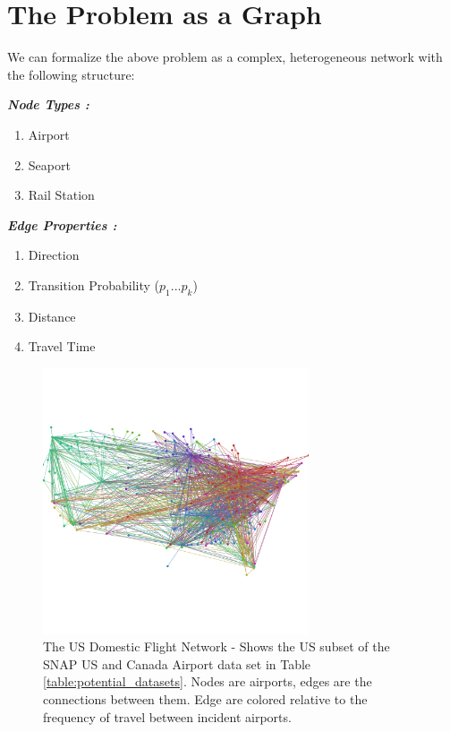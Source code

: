 \section{The Problem as a Graph}\label{sec:asgraph-\myInitials}


We can formalize the above problem as a complex, heterogeneous network with the following structure:

\begin{center}
    \parbox[t]{2.4in}{
        \raggedright%
        \textbf{\textit{Node Types :}}
        \begin{enumerate}[topsep=0pt,itemsep=-2pt,leftmargin=13pt]
            \item Airport
            \item Seaport
            \item Rail Station
        \end{enumerate}
    }%
    \parbox[t]{2.4in}{
        \raggedright%
        \textbf{\textit{Edge Properties :}}
        \begin{enumerate}[topsep=0pt,itemsep=-2pt,leftmargin=13pt]
            \item Direction
            \item Transition Probability ($p_1...p_k$)
            \item Distance
            \item Travel Time
        \end{enumerate}
    }
\end{center}

\begin{figure}[h]
\centering
\includegraphics[width=0.7\textwidth]{figures-RW/usairport_base.png}
    \caption{ \centering
        The US Domestic Flight Network\cite{stanford_dhs} - Shows the US subset of the SNAP US and Canada Airport data set\cite{snapnets} in Table \ref{table:potential_datasets}. Nodes are airports, edges are the connections between them. Edge are colored relative to the frequency of travel between incident airports.
    }
    \label{fig:us_domestic}
\end{figure}

\newpage


